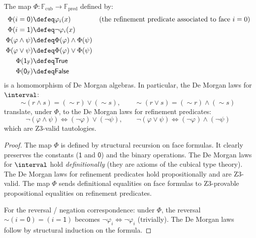 \begin{theorem}
\label{thm:deMorgan-iso}
The map $\Phi : \mathbb{F}_{\mathrm{cub}} \to \mathbb{F}_{\mathrm{pred}}$
defined by:
\begin{align*}
  \Phi(i = \mathsf{0}) &\defeq \varphi_i(x)
    & &\text{(the refinement predicate associated to face $i = 0$)} \\
  \Phi(i = \mathsf{1}) &\defeq \neg\varphi_i(x) \\
  \Phi(\varphi \wedge \psi) &\defeq \Phi(\varphi) \wedge \Phi(\psi) \\
  \Phi(\varphi \vee \psi) &\defeq \Phi(\varphi) \vee \Phi(\psi) \\
  \Phi(\mathsf{1}_\mathbb{F}) &\defeq \mathsf{True} \\
  \Phi(\mathsf{0}_\mathbb{F}) &\defeq \mathsf{False}
\end{align*}
is a homomorphism of De Morgan algebras.  In particular, the De Morgan laws
for $\interval$:
\[
  \sim(r \wedge s) = (\sim r) \vee (\sim s), \qquad
  \sim(r \vee s) = (\sim r) \wedge (\sim s)
\]
translate, under $\Phi$, to the De Morgan laws for refinement predicates:
\[
  \neg(\varphi \wedge \psi) \Leftrightarrow (\neg\varphi) \vee (\neg\psi),
  \qquad
  \neg(\varphi \vee \psi) \Leftrightarrow (\neg\varphi) \wedge (\neg\psi)
\]
which are Z3-valid tautologies.
\end{theorem}

\begin{proof}
The map $\Phi$ is defined by structural recursion on face formulas.  It
clearly preserves the constants ($\mathsf{1}$ and $\mathsf{0}$) and the
binary operations.  The De Morgan laws for $\interval$ hold
\emph{definitionally} (they are axioms of the cubical type theory).  The De
Morgan laws for refinement predicates hold propositionally and are Z3-valid.
The map $\Phi$ sends definitional equalities on face formulas to Z3-provable
propositional equalities on refinement predicates.

For the reversal / negation correspondence: under $\Phi$, the reversal
$\sim(i = \mathsf{0}) = (i = \mathsf{1})$ becomes
$\neg \varphi_i \Leftrightarrow \neg\varphi_i$ (trivially).  The De Morgan
laws follow by structural induction on the formula.
\end{proof}


